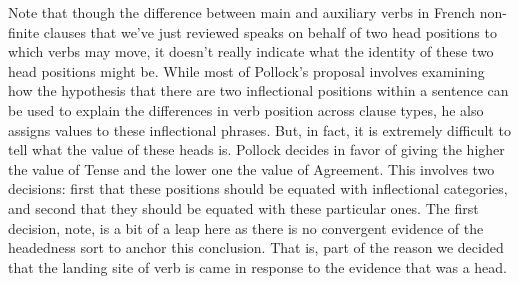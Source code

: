 Note that though the difference between main and auxiliary verbs in French non-finite clauses that we've just reviewed speaks on behalf of two head positions to which verbs may move, it doesn't really indicate what the identity of these two head positions might be. While most of Pollock's proposal involves examining how the hypothesis that there are two inflectional positions within a sentence can be used to explain the differences in verb position across clause types, he also assigns values to these inflectional phrases. But, in fact, it is extremely difficult to tell what the value of these heads is. Pollock decides in favor of giving the higher  the value of Tense and the lower one the value of Agreement. This involves two decisions: first that these positions should be equated with inflectional categories, and second that they should be equated with these particular ones. The first decision, note, is a bit of a leap here as there is no convergent evidence of the headedness sort to anchor this conclusion. That is, part of the reason we decided that the landing site of verb is  came in response to the evidence that  was a head.


